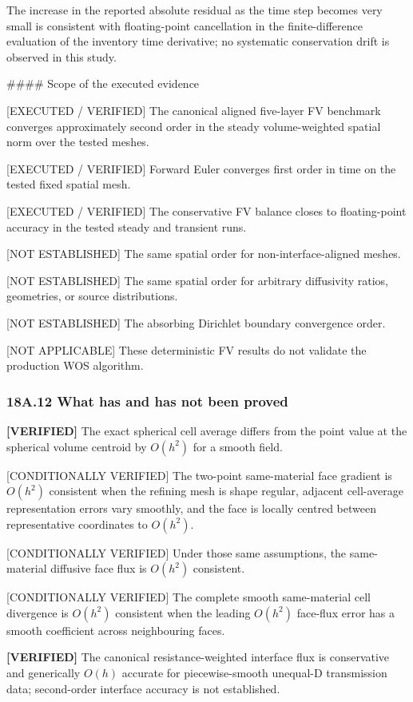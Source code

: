 \documentclass[11pt,a4paper]{article}
\begin{document}
The increase in the reported absolute residual as the time step becomes very small is consistent with floating-point cancellation in the finite-difference evaluation of the inventory time derivative; no systematic conservation drift is observed in this study.

\#\#\#\# Scope of the executed evidence

[EXECUTED / VERIFIED] The canonical aligned five-layer FV benchmark converges approximately second order in the steady volume-weighted spatial norm over the tested meshes.

[EXECUTED / VERIFIED] Forward Euler converges first order in time on the tested fixed spatial mesh.

[EXECUTED / VERIFIED] The conservative FV balance closes to floating-point accuracy in the tested steady and transient runs.

[NOT ESTABLISHED] The same spatial order for non-interface-aligned meshes.

[NOT ESTABLISHED] The same spatial order for arbitrary diffusivity ratios, geometries, or source distributions.

[NOT ESTABLISHED] The absorbing Dirichlet boundary convergence order.

[NOT APPLICABLE] These deterministic FV results do not validate the production WOS algorithm.
\subsubsection*{18A.12 What has and has not been proved}

\textbf{[VERIFIED]} The exact spherical cell average differs from the point value at the spherical volume centroid by $O(h^2)$ for a smooth field.

[CONDITIONALLY VERIFIED] The two-point same-material face gradient is $O(h^2)$ consistent when the refining mesh is shape regular, adjacent cell-average representation errors vary smoothly, and the face is locally centred between representative coordinates to $O(h^2)$.

[CONDITIONALLY VERIFIED] Under those same assumptions, the same-material diffusive face flux is $O(h^2)$ consistent.

[CONDITIONALLY VERIFIED] The complete smooth same-material cell divergence is $O(h^2)$ consistent when the leading $O(h^2)$ face-flux error has a smooth coefficient across neighbouring faces.

\textbf{[VERIFIED]} The canonical resistance-weighted interface flux is conservative and generically $O(h)$ accurate for piecewise-smooth unequal-D transmission data; second-order interface accuracy is not established.
\end{document}
